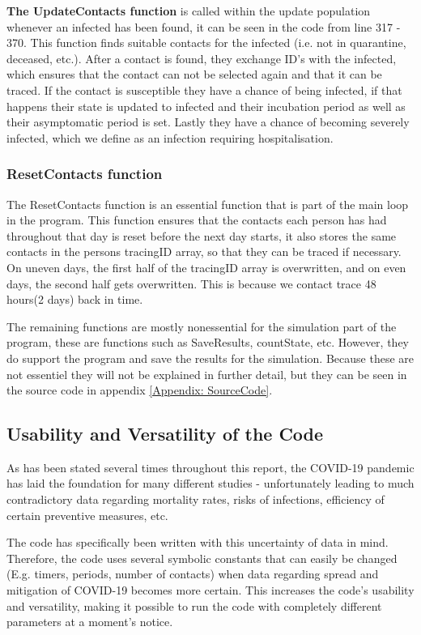 \textbf{The UpdateContacts function} is called within the update population whenever an infected has been found, it can be seen in the code from line 317 - 370. This function finds suitable contacts for the infected (i.e. not in quarantine, deceased, etc.). After a contact is found, they exchange ID's with the infected, which ensures that the contact can not be selected again and that it can be traced. If the contact is susceptible they have a chance of being infected, if that happens their state is updated to infected and their incubation period as well as their asymptomatic period is set. Lastly they have a chance of becoming severely infected, which we define as an infection requiring hospitalisation.

\subsubsection{ResetContacts function}
The ResetContacts function is an essential function that is part of the main loop in the program. This function ensures that the contacts each person has had throughout that day is reset before the next day starts, it also stores the same contacts in the persons tracingID array, so that they can be traced if necessary. On uneven days, the first half of the tracingID array is overwritten, and on even days, the second half gets overwritten. This is because we contact trace 48 hours(2 days) back in time.

The remaining functions are mostly nonessential for the simulation part of the program, these are functions such as SaveResults, countState, etc. However, they do support the program and save the results for the simulation. Because these are not essentiel they will not be explained in further detail, but they can be seen in the source code in appendix \ref{Appendix: SourceCode}.


\subsection{Usability and Versatility of the Code} \label{Usability and versatility of the code}

As has been stated several times throughout this report, the COVID-19 pandemic has laid the foundation for many different studies - unfortunately leading to much contradictory data regarding mortality rates, risks of infections, efficiency of certain preventive measures, etc. 

The code has specifically been written with this uncertainty of data in mind. Therefore, the code uses several symbolic constants that can easily be changed (E.g. timers, periods, number of contacts) when data regarding spread and mitigation of COVID-19 becomes more certain. This increases the code's usability and versatility, making it possible to run the code with completely different parameters at a moment's notice.

